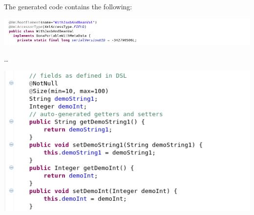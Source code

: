 \documentclass[11pt,a4paper,oneside]{article}
\begin{document}
\noindent The generated code contains the following:

\vspace{2mm}

\hspace{1cm}\includegraphics[scale=0.5]{images/tut1-012-special-1.png}

\ldots

\vspace{2mm}

\hspace{1cm}\includegraphics[scale=0.5]{images/tut1-012-special-2.png}
\end{document}
